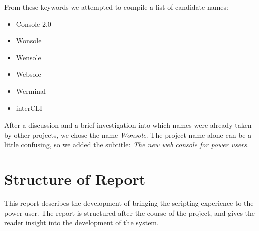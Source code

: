 From these keywords we attempted to compile a list of candidate names:
\begin{itemize}
\item Console 2.0
\item Wonsole
\item Wensole
\item Websole
\item Werminal
\item interCLI
\end{itemize}

After a discussion and a brief investigation into which names were already taken by other projects, we chose the name \emph{Wonsole}. The project name alone can be a little confusing, so we added the subtitle: \emph{The new web console for power users.}

\section{Structure of Report}
This report describes the development of bringing the scripting experience to the power user. 
The report is structured after the course of the project, and gives the reader insight into the development of the system. 

